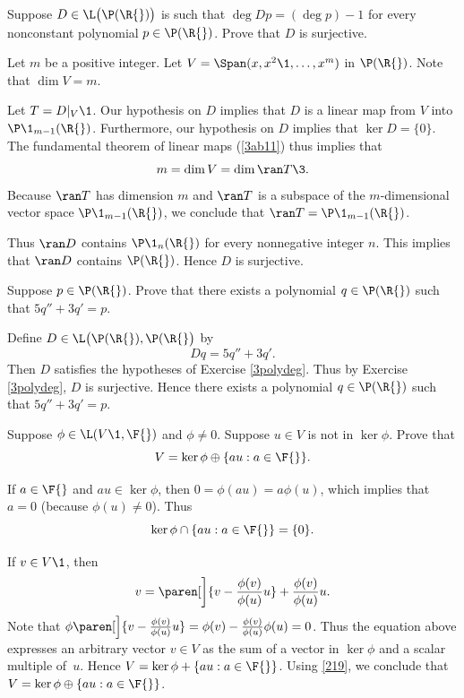 \exercise
Suppose $D \in \L\bigl(\P(\R{})\bigr)$ is such that $\deg Dp = (\deg p) - 1$ for every nonconstant polynomial $p \in \P(\R{})$. Prove that $D$ is surjective.\label{3polydeg}

\begin{Solution}
Let $m$ be a positive integer. Let $V = \Span (x, x^2\1, \dots, x^m)$ in $\P(\R{})$. Note that $\dim V = m$.

Let $T = D|_V\1$. Our hypothesis on $D$ implies that $D$ is a linear map from $V$ into $\P\1_{m-1}(\R{})$. Furthermore, our hypothesis on $D$ implies that $\ker D = \{0\}$. The fundamental theorem of linear maps (\ref{3ab11}) thus implies that
\[
m = \dim V = \dim \ran T\3.
\]
Because $\ran T$ has dimension $m$ and $\ran T$ is a subspace of the $m$-dimensional vector space $\P\1_{m-1}(\R{})$, we conclude that $\ran T = \P\1_{m-1}(\R{})$.

Thus $\ran D$ contains $\P\1_n(\R{})$ for every nonnegative integer $n$. This implies that $\ran D$ contains $\P(\R{})$. Hence $D$ is surjective.
\end{Solution}

\exercise
Suppose $p \in \P(\R{})$. Prove that there exists a polynomial $q \in \P(\R{})$ such that $5 q'' + 3 q' = p$.

\begin{Solution}
Define $D \in \L\bigl(\P(\R{}), \P(\R{}\bigr)$ by
\[
Dq = 5 q'' + 3 q'.
\]
Then $D$ satisfies the hypotheses of Exercise \ref{3polydeg}. Thus by Exercise \ref{3polydeg}, $D$ is surjective. Hence there exists a polynomial $q \in \P(\R{})$ such that $5 q'' + 3 q' = p$.
\end{Solution}

\exercise
Suppose $\phi \in \L(V\1, \F{})$ and $\phi \ne 0$. Suppose $u \in V$ is not in $\ker \phi$. Prove that
\[
V = \ker \phi \oplus \{au: a \in \F{}\}.
\]
\exercisedisplayend

\begin{Solution}
If $a \in \F{}$ and $au \in \ker \phi$, then
$0 = \phi(au) = a \phi(u)$, which implies that $a = 0$ (because $\phi(u) \ne 0$).  Thus
\[
\ker \phi \cap \{au: a \in \F{}\} = \{0\}.
\]

If $v \in V\1$, then
\[
v = \paren[\bigg]{v - \frac{\phi(v)}{\phi(u)}u} + \frac{\phi(v)}{\phi(u)}u.
\]
Note that $\phi\paren[\Big]{v - \frac{\phi(v)}{\phi(u)}u} = \phi(v) - \frac{\phi(v)}{\phi(u)}\phi(u) = 0$.  Thus
the equation above expresses an arbitrary vector $v \in V$ as the sum of a vector
in $\ker \phi$ and a scalar multiple of~$u$.  Hence
\mbox{$V = \ker \phi + \{au: a \in \F{}\}$}.  Using
\ref{219}, we conclude that $V = \ker \phi \oplus \{au: a \in \F{}\}$.
\end{Solution}

